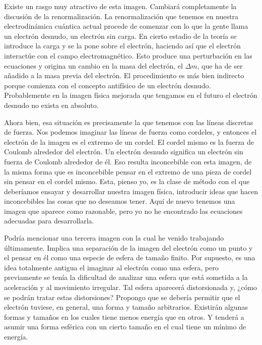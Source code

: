 \documentclass[a4paper, 12pt]{article}
\begin{document}
Existe un rasgo muy atractivo de esta imagen. Cambiará completamente la discusión de la renormalización. La renormalización que tenemos en nuestra electrodinámica cuántica actual procede de comenzar con lo que la gente llama un electrón desnudo, un electrón sin carga. En cierto estadio de la teoría se introduce la carga y se la pone sobre el electrón, haciendo así que el electrón interactúe con el campo electromagnético. Esto produce una perturbación en las ecuaciones y origina un cambio en la masa del electrón, el $\Delta m$, que ha de ser añadido a la masa previa del electrón. El procedimiento es más bien indirecto porque comienza con el concepto antifísico de un electrón desnudo. Probablemente en la imagen física mejorada que tengamos en el futuro el electrón desnudo no exista en absoluto.

Ahora bien, esa situación es precisamente la que tenemos con las líneas discretas de fuerza. Nos podemos imaginar las líneas de fuerza como cordeles, y entonces el electrón de la imagen es el extremo de un cordel. El cordel mismo es la fuerza de Coulomb alrededor del electrón. Un electrón desnudo significa un electrón sin fuerza de Coulomb alrededor de él. Eso resulta inconcebible con esta imagen, de la misma forma que es inconcebible
pensar en el extremo de una pieza de cordel sin pensar en el cordel mismo. Esta, pienso yo, es la clase de método con el que deberíamos ensayar y desarrollar nuestra imagen física, introducir ideas que hacen inconcebibles las cosas que no deseamos tener. Aquí de nuevo tenemos una imagen que aparece como razonable, pero yo no he encontrado las ecuaciones adecuadas para desarrollarla.

Podría mencionar una tercera imagen con la cual he venido trabajando últimamente. Implica una separación de la imagen del electrón como un punto y el pensar en él como una especie de esfera de tamaño finito. Por supuesto, es una idea totalmente antigua el imaginar al electrón como una esfera, pero previamente se tenía la dificultad de analizar una esfera que está sometida a la aceleración y al movimiento irregular. Tal esfera aparecerá distorsionada y, ¿cómo se podrán tratar estas distorsiones? Propongo que se debería permitir que el electrón tuviese, en general, una forma y tamaño arbitrarios. Existirán algunas formas y tamaños en los cuales tiene menos energía que en otros. Y tenderá a asumir una forma esférica con un cierto tamaño en el cual tiene un mínimo de energía.
\end{document}
